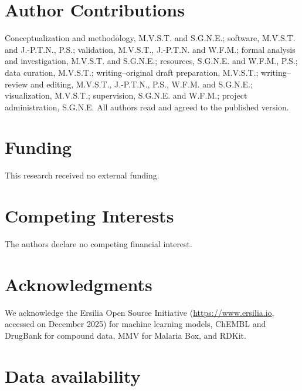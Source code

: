 \documentclass[journal=jcisd8,manuscript=article]{achemso}
\begin{document}
\section*{Author Contributions}
Conceptualization and methodology, M.V.S.T. and S.G.N.E.; software, M.V.S.T. and J.-P.T.N., P.S.; validation, M.V.S.T., J.-P.T.N. and W.F.M.; formal analysis and investigation, M.V.S.T. and S.G.N.E.; resources, S.G.N.E. and W.F.M., P.S.; data curation, M.V.S.T.; writing--original draft preparation, M.V.S.T.; writing--review and editing, M.V.S.T., J.-P.T.N., P.S., W.F.M. and S.G.N.E.; visualization, M.V.S.T.; supervision, S.G.N.E. and W.F.M.; project administration, S.G.N.E. All authors read and agreed to the published version.

\section*{Funding}
This research received no external funding.

\section*{Competing Interests}
The authors declare no competing financial interest.

\section*{Acknowledgments}
We acknowledge the Ersilia Open Source Initiative (\url{https://www.ersilia.io}, accessed on December 2025) for machine learning models, ChEMBL and DrugBank for compound data, MMV for Malaria Box, and RDKit.

\section*{Data availability}
\end{document}
